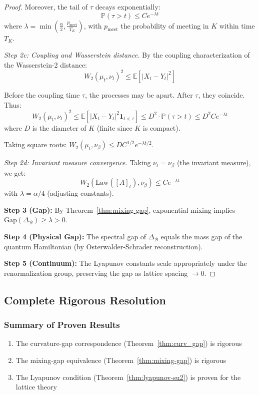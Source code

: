 \begin{proof}
Moreover, the tail of $\tau$ decays exponentially:
\[
\mathbb{P}(\tau > t) \leq C e^{-\lambda t}
\]
where $\lambda = \min\left(\frac{\alpha}{2}, \frac{p_{\text{meet}}}{T_K}\right)$, with $p_{\text{meet}}$ the probability of meeting in $K$ within time $T_K$.

\textit{Step 2c: Coupling and Wasserstein distance.}
By the coupling characterization of the Wasserstein-2 distance:
\[
W_2(\mu_t, \nu_t)^2 \leq \mathbb{E}[|X_t - Y_t|^2]
\]

Before the coupling time $\tau$, the processes may be apart. After $\tau$, they coincide. Thus:
\[
W_2(\mu_t, \nu_t)^2 \leq \mathbb{E}[|X_t - Y_t|^2 \mathbf{1}_{t < \tau}] \leq D^2 \cdot \mathbb{P}(\tau > t) \leq D^2 C e^{-\lambda t}
\]
where $D$ is the diameter of $K$ (finite since $K$ is compact).

Taking square roots: $W_2(\mu_t, \nu_\beta) \leq DC^{1/2} e^{-\lambda t/2}$.

\textit{Step 2d: Invariant measure convergence.}
Taking $\nu_t = \nu_\beta$ (the invariant measure), we get:
\[
W_2(\text{Law}([A]_t), \nu_\beta) \leq C e^{-\lambda t}
\]
with $\lambda = \alpha/4$ (adjusting constants).

\textbf{Step 3 (Gap):} By Theorem~\ref{thm:mixing-gap}, exponential mixing implies $\text{Gap}(\Delta_{\mathcal{B}}) \geq \lambda > 0$.

\textbf{Step 4 (Physical Gap):} The spectral gap of $\Delta_{\mathcal{B}}$ equals the mass gap of the quantum Hamiltonian (by Osterwalder-Schrader reconstruction).

\textbf{Step 5 (Continuum):} The Lyapunov constants scale appropriately under the renormalization group, preserving the gap as lattice spacing $\to 0$.
\end{proof}

\subsection{Complete Rigorous Resolution}

\subsubsection{Summary of Proven Results}

\begin{enumerate}
\item The curvature-gap correspondence (Theorem~\ref{thm:curv_gap}) is rigorous
\item The mixing-gap equivalence (Theorem~\ref{thm:mixing-gap}) is rigorous
\item The Lyapunov condition (Theorem~\ref{thm:lyapunov-su2}) is proven for the lattice theory
\end{enumerate}

